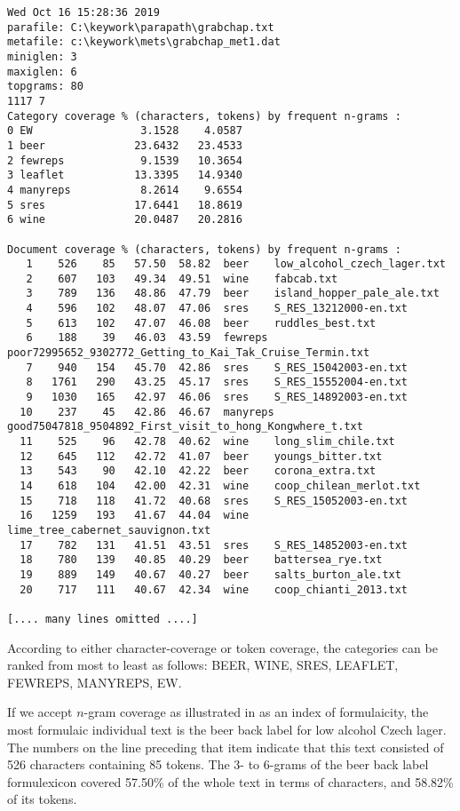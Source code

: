 \documentclass[output=paper]{langscibook}
\begin{document}
\begin{lstlisting}
Wed Oct 16 15:28:36 2019
parafile: C:\keywork\parapath\grabchap.txt
metafile: c:\keywork\mets\grabchap_met1.dat
miniglen: 3
maxiglen: 6
topgrams: 80
1117 7
Category coverage % (characters, tokens) by frequent n-grams :
0 EW                 3.1528    4.0587
1 beer              23.6432   23.4533
2 fewreps            9.1539   10.3654
3 leaflet           13.3395   14.9340
4 manyreps           8.2614    9.6554
5 sres              17.6441   18.8619
6 wine              20.0487   20.2816

Document coverage % (characters, tokens) by frequent n-grams :
   1    526    85   57.50  58.82  beer    low_alcohol_czech_lager.txt
   2    607   103   49.34  49.51  wine    fabcab.txt
   3    789   136   48.86  47.79  beer    island_hopper_pale_ale.txt
   4    596   102   48.07  47.06  sres    S_RES_13212000-en.txt
   5    613   102   47.07  46.08  beer    ruddles_best.txt
   6    188    39   46.03  43.59  fewreps poor72995652_9302772_Getting_to_Kai_Tak_Cruise_Termin.txt
   7    940   154   45.70  42.86  sres    S_RES_15042003-en.txt
   8   1761   290   43.25  45.17  sres    S_RES_15552004-en.txt
   9   1030   165   42.97  46.06  sres    S_RES_14892003-en.txt
  10    237    45   42.86  46.67  manyreps good75047818_9504892_First_visit_to_hong_Kongwhere_t.txt
  11    525    96   42.78  40.62  wine    long_slim_chile.txt
  12    645   112   42.72  41.07  beer    youngs_bitter.txt
  13    543    90   42.10  42.22  beer    corona_extra.txt
  14    618   104   42.00  42.31  wine    coop_chilean_merlot.txt
  15    718   118   41.72  40.68  sres    S_RES_15052003-en.txt
  16   1259   193   41.67  44.04  wine    lime_tree_cabernet_sauvignon.txt
  17    782   131   41.51  43.51  sres    S_RES_14852003-en.txt
  18    780   139   40.85  40.29  beer    battersea_rye.txt
  19    889   149   40.67  40.27  beer    salts_burton_ale.txt
  20    717   111   40.67  42.34  wine    coop_chianti_2013.txt

[.... many lines omitted ....]
\end{lstlisting}

According to either character-coverage or token coverage, the categories can be ranked from most to least as follows: BEER, WINE, SRES, LEAFLET, FEWREPS, MANYREPS, EW.

If we accept $n$-gram coverage as illustrated in  as an index of formulaicity, the most formulaic individual text is the beer back label for low alcohol Czech lager. The numbers on the line preceding that item indicate that this text consisted of 526 characters containing 85 tokens. The 3- to 6-grams of the beer back label formulexicon covered 57.50\% of the whole text in terms of characters, and 58.82\% of its tokens.
\end{document}
